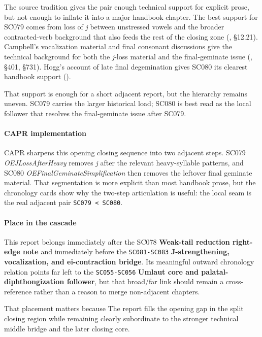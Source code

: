 \documentclass[
  british,
  a4paper,
]{article}
\begin{document}
The source tradition gives the pair enough technical support for
explicit prose, but not enough to inflate it into a major handbook
chapter. The best support for SC079 comes from loss of \emph{j} between
unstressed vowels and the broader contracted-verb background that also
feeds the rest of the closing zone (, §12.21). Campbell's vocalization material and final
consonant discussions give the technical background for both the
\emph{j}-loss material and the final-geminate issue
(, §401,
§731). Hogg's account of late final degemination gives SC080 its
clearest handbook support ().

That support is enough for a short adjacent report, but the hierarchy
remains uneven. SC079 carries the larger historical load; SC080 is best
read as the local follower that resolves the final-geminate issue after
SC079.

\paragraph{CAPR implementation}\label{capr-implementation-49}

CAPR sharpens this opening closing sequence into two adjacent steps.
SC079 \emph{OEJLossAfterHeavy} removes \emph{j} after the relevant
heavy-syllable patterns, and SC080 \emph{OEFinalGeminateSimplification}
then removes the leftover final geminate material. That segmentation is
more explicit than most handbook prose, but the chronology cards show
why the two-step articulation is useful: the local seam is the real
adjacent pair \texttt{SC079\ \textless{}\ SC080}.

\paragraph{Place in the cascade}\label{place-in-the-cascade-49}

This report belongs immediately after the SC078 \textbf{Weak-tail
reduction right-edge note} and immediately before the
\texttt{SC081-SC083} \textbf{J-strengthening, vocalization, and
ei-contraction bridge}. Its meaningful outward chronology relation
points far left to the \texttt{SC055-SC056} \textbf{Umlaut core and
palatal-diphthongization follower}, but that broad/far link should
remain a cross-reference rather than a reason to merge non-adjacent
chapters.

That placement matters because The report fills the opening gap in the
split closing region while remaining clearly subordinate to the stronger
technical middle bridge and the later closing core.
\end{document}
